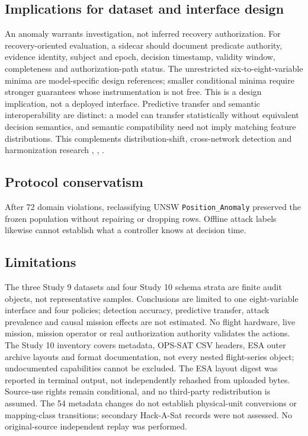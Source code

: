 \documentclass[preprint,12pt]{elsarticle}
\begin{document}
\subsection{Implications for dataset and interface design}
An anomaly warrants investigation, not inferred recovery authorization. For recovery-oriented evaluation, a sidecar should document predicate authority, evidence identity, subject and epoch, decision timestamp, validity window, completeness and authorization-path status. The unrestricted six-to-eight-variable minima are model-specific design references; smaller conditional minima require stronger guarantees whose instrumentation is not free. This is a design implication, not a deployed interface. Predictive transfer and semantic interoperability are distinct: a model can transfer statistically without equivalent decision semantics, and semantic compatibility need not imply matching feature distributions. This complements distribution-shift, cross-network detection and harmonization research \cite{koh2021wilds}, \cite{cerasuolo2026transfer}, \cite{rodriguez2026harmonization}.

\subsection{Protocol conservatism}
After 72 domain violations, reclassifying UNSW \texttt{Position\_Anomaly} preserved the frozen population without repairing or dropping rows. Offline attack labels likewise cannot establish what a controller knows at decision time.

\subsection{Limitations}
The three Study 9 datasets and four Study 10 schema strata are finite audit objects, not representative samples. Conclusions are limited to one eight-variable interface and four policies; detection accuracy, predictive transfer, attack prevalence and causal mission effects are not estimated. No flight hardware, live mission, mission operator or real authorization authority validates the actions. The Study 10 inventory covers metadata, OPS-SAT CSV headers, ESA outer archive layouts and format documentation, not every nested flight-series object; undocumented capabilities cannot be excluded. The ESA layout digest was reported in terminal output, not independently rehashed from uploaded bytes. Source-use rights remain conditional, and no third-party redistribution is assumed. The 54 metadata changes do not establish physical-unit conversions or mapping-class transitions; secondary Hack-A-Sat records were not assessed. No original-source independent replay was performed.
\end{document}
